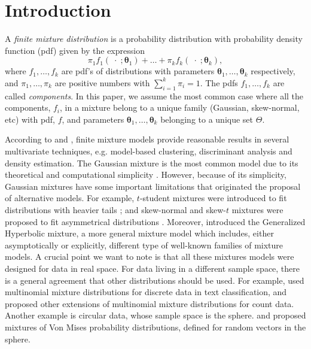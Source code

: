 \documentclass[12pt, a4paper]{article}
\newcommand{\m}[1]{\boldsymbol{#1}}
\begin{document}

\section{Introduction}

\noindent  A \emph{finite mixture distribution} is a probability distribution with probability density function (pdf) given by the expression
\begin{equation}\label{mixt}
\pi_1 f_1(\;\cdot\; ; \m\theta_1) + \dots + \pi_k f_k(\;\cdot\; ; \m\theta_k),
\end{equation}
where $f_1, \dots, f_k$ are pdf's of distributions with parameters $\m\theta_1, \dots, \m\theta_k$ respectively, and $\pi_1, \dots, \pi_k$ are positive numbers with $\sum_{i=1}^k \pi_i = 1$. The pdfs $f_1, \dots, f_k$ are called \emph{components}. In this paper, we assume the most common case where all the components, $f_i$, in a mixture belong to a unique family (Gaussian, skew-normal, etc) with pdf, $f$, and parameters $\m\theta_1, \dots, \m\theta_k$ belonging to a unique set $\Theta$. 

According to \cite{scott1971clustering} and \cite{mclachlan2000finite}, finite mixture models provide reasonable results in several multivariate techniques, e.g. model-based clustering, discriminant analysis and density estimation. The Gaussian mixture is the most common model due to its theoretical and computational simplicity \citep{mclachlan2000finite}. 
However, because of its simplicity, Gaussian mixtures have some important limitations 
that originated the proposal of alternative models. For example, $t$-student mixtures were introduced to fit distributions with heavier tails \citep{andrews2012model, lee2013finite, lin2010robust}; and skew-normal and skew-$t$ mixtures were proposed to fit asymmetrical distributions \citep{lee2011fitting}. Moreover, \cite{browne2013mixture} introduced the Generalized Hyperbolic mixture, a more general mixture model which includes, either asymptotically or explicitly, different type of well-known families of mixture models. A crucial point we want to note is that all these mixtures models were designed for data in real space. For data living in a different sample space, there is a general agreement that other distributions should be used. 
For example, \cite{bickel2004multi} used multinomial mixture distributions for discrete data in text classification, and  
 \cite{bouguila2011count} proposed other extensions of multinomial mixture distributions for count data. 
Another example is circular data, whose sample space is the sphere.  \cite{banerjee2005clustering} and \cite{mardia2007protein} proposed mixtures of Von Mises probability distributions, defined for random vectors in the sphere.
\end{document}
